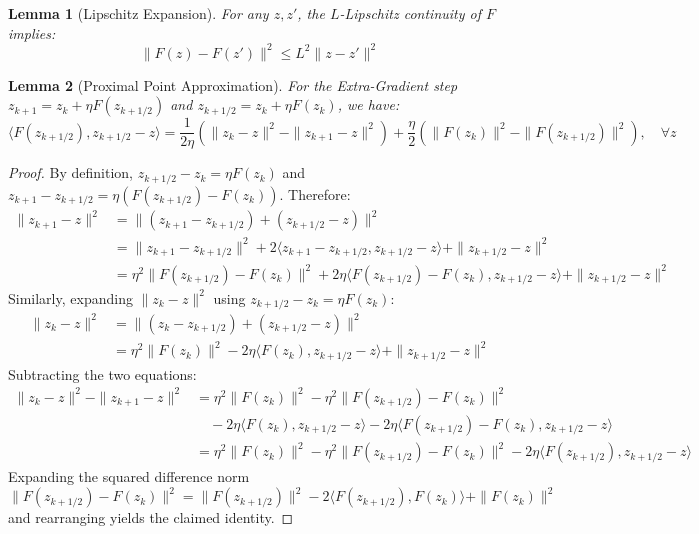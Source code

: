 \documentclass{article}
\newtheorem{lemma}{Lemma}
\begin{document}
\begin{lemma}[Lipschitz Expansion]
For any $z, z'$, the $L$-Lipschitz continuity of $F$ implies:
$$ \|F(z) - F(z')\|^2 \leq L^2 \|z - z'\|^2 $$
\end{lemma}

\begin{lemma}[Proximal Point Approximation]
For the Extra-Gradient step $z_{k+1} = z_k + \eta F(z_{k+1/2})$ and $z_{k+1/2} = z_k + \eta F(z_k)$, we have:
$$ \langle F(z_{k+1/2}), z_{k+1/2} - z \rangle = \frac{1}{2\eta} \left( \|z_k - z\|^2 - \|z_{k+1} - z\|^2 \right) + \frac{\eta}{2} \left( \|F(z_k)\|^2 - \|F(z_{k+1/2})\|^2 \right), \quad \forall z $$
\end{lemma}
\begin{proof}
By definition, $z_{k+1/2} - z_k = \eta F(z_k)$ and $z_{k+1} - z_{k+1/2} = \eta (F(z_{k+1/2}) - F(z_k))$. Therefore:
\begin{align*}
\|z_{k+1} - z\|^2 &= \|(z_{k+1} - z_{k+1/2}) + (z_{k+1/2} - z)\|^2 \\
&= \|z_{k+1} - z_{k+1/2}\|^2 + 2\langle z_{k+1} - z_{k+1/2}, z_{k+1/2} - z \rangle + \|z_{k+1/2} - z\|^2 \\
&= \eta^2 \|F(z_{k+1/2}) - F(z_k)\|^2 + 2\eta \langle F(z_{k+1/2}) - F(z_k), z_{k+1/2} - z \rangle + \|z_{k+1/2} - z\|^2
\end{align*}
Similarly, expanding $\|z_k - z\|^2$ using $z_{k+1/2} - z_k = \eta F(z_k)$:
\begin{align*}
\|z_k - z\|^2 &= \|(z_k - z_{k+1/2}) + (z_{k+1/2} - z)\|^2 \\
&= \eta^2 \|F(z_k)\|^2 - 2\eta \langle F(z_k), z_{k+1/2} - z \rangle + \|z_{k+1/2} - z\|^2
\end{align*}
Subtracting the two equations:
\begin{align*}
\|z_k - z\|^2 - \|z_{k+1} - z\|^2 &= \eta^2 \|F(z_k)\|^2 - \eta^2 \|F(z_{k+1/2}) - F(z_k)\|^2 \\
&\quad - 2\eta \langle F(z_k), z_{k+1/2} - z \rangle - 2\eta \langle F(z_{k+1/2}) - F(z_k), z_{k+1/2} - z \rangle \\
&= \eta^2 \|F(z_k)\|^2 - \eta^2 \|F(z_{k+1/2}) - F(z_k)\|^2 - 2\eta \langle F(z_{k+1/2}), z_{k+1/2} - z \rangle
\end{align*}
Expanding the squared difference norm $\|F(z_{k+1/2}) - F(z_k)\|^2 = \|F(z_{k+1/2})\|^2 - 2\langle F(z_{k+1/2}), F(z_k) \rangle + \|F(z_k)\|^2$ and rearranging yields the claimed identity.
\end{proof}
\end{document}

